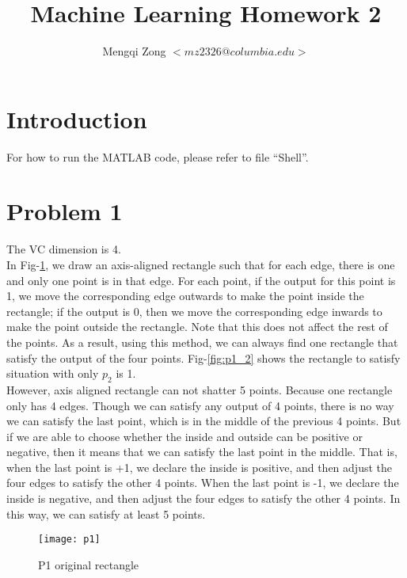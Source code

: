 \documentclass[12pt]{article}
\title{Machine Learning Homework 2}
\author{Mengqi Zong $<mz2326@columbia.edu>$}
\begin{document}
\maketitle

\setlength{\parindent}{0in}

\section*{Introduction}

For how to run the MATLAB code, please refer to file ``Shell''.

\section*{Problem 1}

The VC dimension is 4. \\

In Fig-\ref{fig:p1}, we draw an axis-aligned rectangle such that for each edge, there is one and only one point is in that edge. For each point, if the output for this point is 1, we move the corresponding edge outwards to make the point inside the rectangle; if the output is 0, then we move the corresponding edge inwards to make the point outside the rectangle. Note that this does not affect the rest of the points. As a result, using this method, we can always find one rectangle that satisfy the output of the four points. Fig-\ref{fig:p1_2} shows the rectangle to satisfy situation with only $p_2$ is 1. \\

However, axis aligned rectangle can not shatter 5 points. Because one rectangle only has 4 edges. Though we can satisfy any output of 4 points, there is no way we can satisfy the last point, which is in the middle of the previous 4 points. But if we are able to choose whether the inside and outside can be positive or negative, then it means that we can satisfy the last point in the middle. That is, when the last point is +1, we declare the inside is positive, and then adjust the four edges to satisfy the other 4 points. When the last point is -1, we declare the inside is negative, and then adjust the four edges to satisfy the other 4 points. In this way, we can satisfy at least 5 points.

\begin{figure}[ht!]
  \centering
  \texttt{[image: p1]}
  \caption{P1 original rectangle \label{fig:p1}}
\end{figure}
\end{document}
